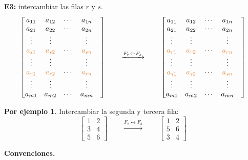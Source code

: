 \documentclass{article}
\theoremstyle{definition}
\theoremstyle{definition}
\newtheorem*{ej}{Por ejemplo}
\theoremstyle{remark}
\begin{document}
\textbf{E3:} intercambiar las filas $r$ y $s$. \[
\begin{bmatrix}
  a_{11} &   a_{12}    & \cdots & a_{1n}   \\ 
  a_{21} &   a_{22}    & \cdots & a_{2n}   \\ 
\vdots & \vdots & & \vdots & \\
\textcolor{rojop2}{a_{s1}} & \textcolor{rojop2}{a_{s2}} & \cdots  &  \textcolor{rojop2}{a_{sn}} \\
\vdots & \vdots & & \vdots \\
\textcolor{rojop2}{a_{r1}} & \textcolor{rojop2}{a_{r2}} & \cdots  &  \textcolor{rojop2}{a_{rn}} \\
\vdots & \vdots & & \vdots & \\
  a_{m1} &   a_{m2}    & \cdots & a_{mn}   \\ 
\end{bmatrix} \quad \quad \xrightarrow{F_r \leftrightarrow F_s} \quad \quad  \begin{bmatrix}
  a_{11} &   a_{12}    & \cdots & a_{1n}   \\ 
  a_{21} &   a_{22}    & \cdots & a_{2n}   \\ 
\vdots & \vdots & & \vdots & \\
\textcolor{rojop2}{a_{r1}} & \textcolor{rojop2}{a_{r2}} & \cdots  &  \textcolor{rojop2}{a_{rn}} \\
\vdots & \vdots & & \vdots \\
\textcolor{rojop2}{a_{s1}} & \textcolor{rojop2}{a_{s2}} & \cdots  &  \textcolor{rojop2}{a_{sn}} \\
\vdots & \vdots & & \vdots & \\
  a_{m1} &   a_{m2}    & \cdots & a_{mn}   \\ 
\end{bmatrix} 
\]
\begin{ej}
  Intercambiar la segunda y tercera fila: 
  \[
    \begin{bmatrix} 
      1 & 2 \\
      3 & 4 \\
      5 & 6
      \end{bmatrix} \quad \quad \xrightarrow{F_2 \leftrightarrow F_3}\quad\quad \begin{bmatrix}
      1 & 2 \\
      5 & 6 \\
      3 & 4
    \end{bmatrix}
  \]
\end{ej}
\begin{center}\pagebreak 
\textbf{Convenciones.}
\end{center}
\end{document}
